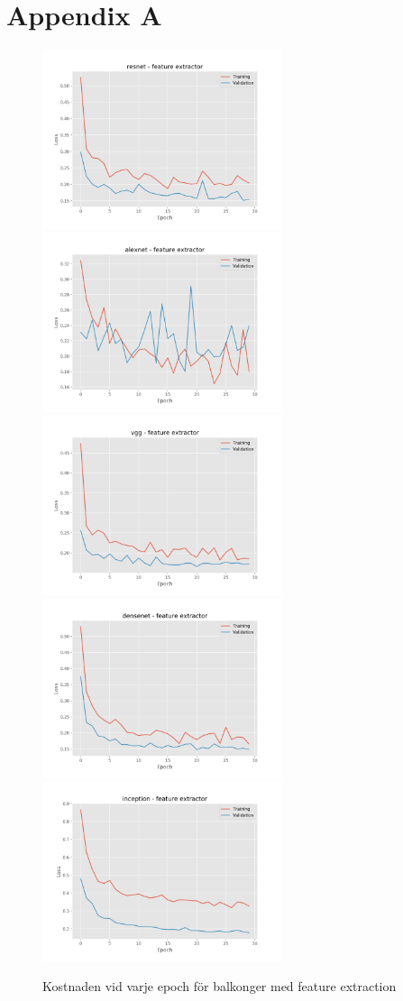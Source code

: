 \documentclass[]{kththesis}
\begin{document}
\printbibliography[heading=bibintoc]
\appendix
  \chapter{Appendix A}
  
  \begin{figure}[h]
    \includegraphics[width=7cm]{b_l_resnet_fe}
    \includegraphics[width=7cm]{b_l_alexnet_fe}
    \includegraphics[width=7cm]{b_l_vgg_fe}
    \includegraphics[width=7cm]{b_l_densenet_fe}
    \includegraphics[width=7cm]{b_l_inception_fe}
    \caption{Kostnaden vid varje epoch för balkonger med feature extraction}
    \label{fig:b_l_1}
  \end{figure}
\end{document}

